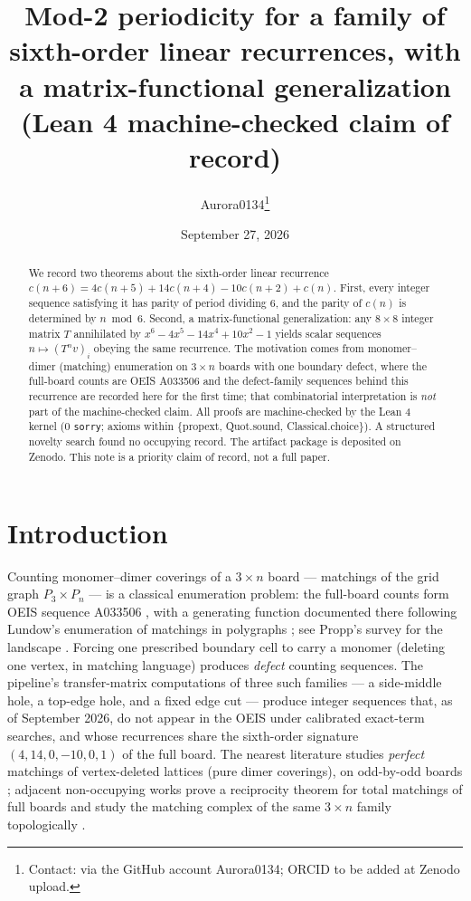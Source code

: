 \documentclass[11pt]{article}
\title{Mod-2 periodicity for a family of sixth-order linear recurrences,
with a matrix-functional generalization\\
(Lean 4 machine-checked claim of record)}
\author{Aurora0134\thanks{Contact: via the GitHub account Aurora0134; ORCID to
be added at Zenodo upload.}}
\date{September 27, 2026}
\begin{document}
\maketitle

\begin{abstract}
We record two theorems about the sixth-order linear recurrence
$c(n+6)=4c(n+5)+14c(n+4)-10c(n+2)+c(n)$. First, every integer sequence
satisfying it has parity of period dividing $6$, and the parity of $c(n)$ is
determined by $n \bmod 6$. Second, a matrix-functional generalization: any
$8\times 8$ integer matrix $T$ annihilated by $x^6-4x^5-14x^4+10x^2-1$ yields
scalar sequences $n\mapsto (T^n v)_i$ obeying the same recurrence. The
motivation comes from monomer--dimer (matching) enumeration on $3\times n$
boards with one boundary defect, where the full-board counts are OEIS A033506
and the defect-family sequences behind this recurrence are recorded here for
the first time; that combinatorial interpretation is \emph{not} part of the
machine-checked claim. All proofs are machine-checked by the Lean 4 kernel
(0 \texttt{sorry}; axioms within \{propext, Quot.sound, Classical.choice\}). A
structured novelty search found no occupying record. The artifact package is
deposited on Zenodo. This note is a priority claim of record, not a full
paper.
\end{abstract}

\section{Introduction}

Counting monomer--dimer coverings of a $3\times n$ board --- matchings of the
grid graph $P_3 \times P_n$ --- is a classical enumeration problem: the
full-board counts form OEIS sequence A033506 \cite{oeis-a033506}, with a
generating function documented there following Lundow's enumeration of
matchings in polygraphs \cite{lundow-1996,lundow-1998}; see Propp's survey
for the landscape \cite{propp-1999}. Forcing one prescribed boundary cell to
carry a monomer (deleting one vertex, in matching language) produces
\emph{defect} counting sequences. The pipeline's transfer-matrix computations
of three such families --- a side-middle hole, a top-edge hole, and a fixed
edge cut --- produce integer sequences that, as of September 2026, do not
appear in the OEIS under calibrated exact-term searches, and whose recurrences
share the sixth-order signature $(4,14,0,-10,0,1)$ of the full board. The
nearest literature studies \emph{perfect} matchings of vertex-deleted lattices
(pure dimer coverings), on odd-by-odd boards \cite{tzeng-wu-2003,wu-2006,oh-2019};
adjacent non-occupying works prove a reciprocity theorem for total matchings
of full boards \cite{anzalone-2003} and study the matching complex of the same
$3\times n$ family topologically \cite{goyal-2021}.
\end{document}
